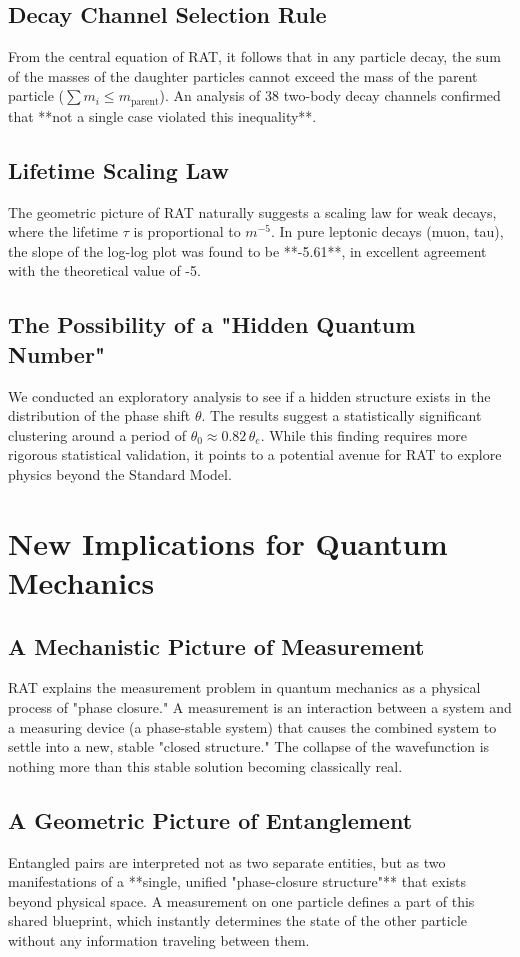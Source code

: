 \documentclass[11pt,a4paper]{article}
\begin{document}
\subsection{Decay Channel Selection Rule}
From the central equation of RAT, it follows that in any particle decay, the sum of the masses of the daughter particles cannot exceed the mass of the parent particle ($\sum m_i \le m_{\text{parent}}$). An analysis of 38 two-body decay channels confirmed that **not a single case violated this inequality**.
\subsection{Lifetime Scaling Law}
The geometric picture of RAT naturally suggests a scaling law for weak decays, where the lifetime $\tau$ is proportional to $m^{-5}$. In pure leptonic decays (muon, tau), the slope of the log-log plot was found to be **-5.61**, in excellent agreement with the theoretical value of -5.
\subsection{The Possibility of a "Hidden Quantum Number"}
We conducted an exploratory analysis to see if a hidden structure exists in the distribution of the phase shift $\theta$. The results suggest a statistically significant clustering around a period of $\theta_0 \approx 0.82\,\theta_e$. While this finding requires more rigorous statistical validation, it points to a potential avenue for RAT to explore physics beyond the Standard Model.

\section{New Implications for Quantum Mechanics}
\subsection{A Mechanistic Picture of Measurement}
RAT explains the measurement problem in quantum mechanics as a physical process of "phase closure." A measurement is an interaction between a system and a measuring device (a phase-stable system) that causes the combined system to settle into a new, stable "closed structure." The collapse of the wavefunction is nothing more than this stable solution becoming classically real.
\subsection{A Geometric Picture of Entanglement}
Entangled pairs are interpreted not as two separate entities, but as two manifestations of a **single, unified "phase-closure structure"** that exists beyond physical space. A measurement on one particle defines a part of this shared blueprint, which instantly determines the state of the other particle without any information traveling between them.
\end{document}
